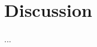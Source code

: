 \documentclass[aps,pra,twocolumn,showpacs]{revtex4-1}
\begin{document}
%

\section{Discussion}

...
\end{document}
